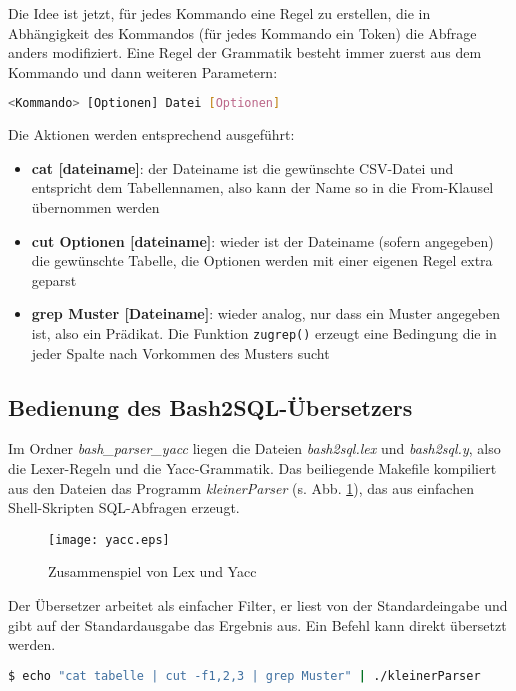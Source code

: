 Die Idee ist jetzt, für jedes Kommando eine Regel zu erstellen, die in Abhängigkeit des Kommandos (für jedes Kommando ein Token) die Abfrage anders modifiziert. Eine Regel der Grammatik besteht immer zuerst aus dem Kommando und dann weiteren Parametern:

\begin{lstlisting}[language=Bash]
<Kommando> [Optionen] Datei [Optionen]
\end{lstlisting}

Die Aktionen werden entsprechend ausgeführt:
\begin{itemize}
\item \textbf{cat [dateiname]}: der Dateiname ist die gewünschte CSV-Datei und entspricht dem Tabellennamen, also kann der Name so in die From-Klausel übernommen werden
\item \textbf{cut Optionen [dateiname]}: wieder ist der Dateiname (sofern angegeben) die gewünschte Tabelle, die Optionen werden mit einer eigenen Regel extra geparst
\item \textbf{grep Muster [Dateiname]}: wieder analog, nur dass ein Muster angegeben ist, also ein Prädikat. Die Funktion \lstinline{zugrep()} erzeugt eine Bedingung die in jeder Spalte nach Vorkommen des Musters sucht
\end{itemize}

\subsection{Bedienung des Bash2SQL-Übersetzers}
Im Ordner \textit{bash\_parser\_yacc} liegen die Dateien \textit{bash2sql.lex} und \textit{bash2sql.y}, also die Lexer-Regeln und die Yacc-Grammatik. Das beiliegende Makefile kompiliert aus den Dateien das Programm \textit{kleinerParser} (s. Abb. \ref{fig:lexyacc}), das aus einfachen Shell-Skripten SQL-Abfragen erzeugt.

\begin{figure}[h]
\centering
\texttt{[image: yacc.eps]}
\caption{Zusammenspiel von Lex und Yacc}
\label{fig:lexyacc}
\end{figure}

Der Übersetzer arbeitet als einfacher Filter, er liest von der Standardeingabe und gibt auf der Standardausgabe das Ergebnis aus. Ein Befehl kann direkt übersetzt werden.

\begin{lstlisting}[language=Bash]
$ echo "cat tabelle | cut -f1,2,3 | grep Muster" | ./kleinerParser
\end{lstlisting}

